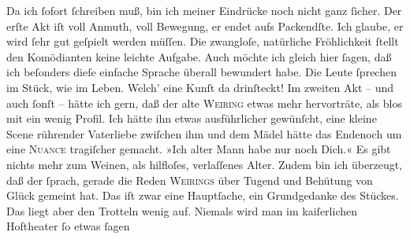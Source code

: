 \pstart
           Da ich ſofort ſchreiben muß, bin ich meiner Eindrücke noch nicht ganz ſicher. Der
               erſte Akt iſt voll Anmuth,
               voll Bewegung, er endet aufs {\pb}Packendſte. Ich
               glaube, er wird ſehr gut geſpielt werden müſſen. Die zwangloſe, natürliche
               Fröhlichkeit ſtellt den Komödianten keine leichte Aufgabe. Auch möchte ich gleich
               hier ſagen, daß ich beſonders dieſe einfache Sprache überall bewundert habe.  Die Leute ſprechen im Stück, wie im Leben. Welch’ eine Kunſt da
               drinſteckt! Im zweiten Akt –
               und auch ſonſt – hätte ich gern, daß der alte \textsc{Weiring} etwas mehr  hervorträte, als blos mit ein wenig Profil. Ich hätte ihn etwas ausführlicher
               gewünſcht,  eine kleine Scene
               rührender Vaterliebe zwiſchen ihm und dem Mädel hätte das Endenoch um eine \textsc{Nuance}
               tragiſcher gemacht. »Ich alter Mann\strikeout{,} habe nur noch
               Dich.« Es gibt nichts mehr zum Weinen, als hilfloſes, verlaſſenes Alter. Zudem bin
               ich überzeugt, daß der \label{K_L02726-2v}\label{K_L02726-2}
               ſprach, gerade die Reden \textsc{Weirings} über Tugend
               und Behütung von Glück gemeint hat. Das iſt zwar eine Hauptſache, ein Grundgedanke
               des Stückes. Das liegt aber
               den Trotteln wenig auf. Niemals wird man im kaiſerlichen Hoftheater ſo etwas ſagen
